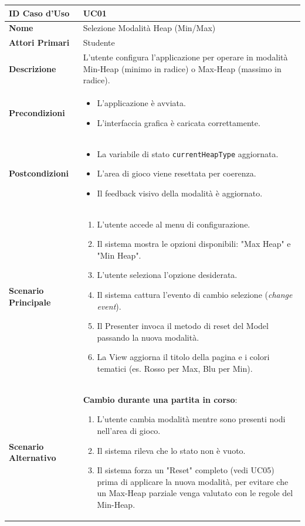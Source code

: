 \documentclass[openany]{theme/uniprthesis}
\begin{document}
\begin{xltabular}{\textwidth}{|l|X|}
\hline
\textbf{ID Caso d'Uso} & UC01 \\
\hline
\textbf{Nome} & Selezione Modalità Heap (Min/Max) \\
\hline
\textbf{Attori Primari} & Studente \\
\hline
\textbf{Descrizione} & L'utente configura l'applicazione per operare in modalità Min-Heap (minimo in radice) o Max-Heap (massimo in radice). \\
\hline
\textbf{Precondizioni} & \begin{itemize}
    \item L'applicazione è avviata.
    \item L'interfaccia grafica è caricata correttamente.
\end{itemize} \\
\hline
\textbf{Postcondizioni} & \begin{itemize}
    \item La variabile di stato \texttt{currentHeapType}  aggiornata.
    \item L'area di gioco viene resettata per coerenza.
    \item Il feedback visivo della modalità è aggiornato.
\end{itemize} \\
\hline
\textbf{Scenario Principale} & \begin{enumerate}
    \item L'utente accede al menu di configurazione.
    \item Il sistema mostra le opzioni disponibili: "Max Heap" e "Min Heap".
    \item L'utente seleziona l'opzione desiderata.
    \item Il sistema cattura l'evento di cambio selezione (\textit{change event}).
    \item Il Presenter invoca il metodo di reset del Model passando la nuova modalità.
    \item La View aggiorna il titolo della pagina e i colori tematici (es. Rosso per Max, Blu per Min).
\end{enumerate} \\
\hline
\textbf{Scenario Alternativo} & \textbf{Cambio durante una partita in corso}:
\begin{enumerate}
    \item L'utente cambia modalità mentre sono presenti nodi nell'area di gioco.
    \item Il sistema rileva che lo stato non è vuoto.
    \item Il sistema forza un "Reset" completo (vedi UC05) prima di applicare la nuova modalità, per evitare che un Max-Heap parziale venga valutato con le regole del Min-Heap.
\end{enumerate} \\
\hline
\end{xltabular}
\end{document}
